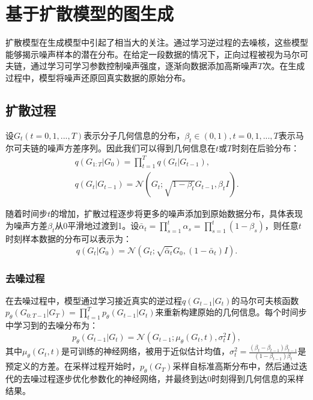 \section{基于扩散模型的图生成}
扩散模型在生成模型中引起了相当大的关注。通过学习逆过程的去噪核，这些模型能够揭示噪声样本的潜在分布。在给定一段数据的情况下，正向过程被视为马尔可夫链，通过学习可学习参数控制噪声强度，逐渐向数据添加高斯噪声$T$次。在生成过程中，模型将噪声还原回真实数据的原始分布。

\subsection{扩散过程}
设$G_t (t=0, 1, ..., T)$表示分子几何信息的分布，$\beta_t \in (0, 1), t=0, 1, ..., T$表示马尔可夫链的噪声方差序列。因此我们可以得到几何信息在$t$或$T$时刻在后验分布：
\begin{eqnarray}
&q(G_{1:T} | G_0) = \prod^T_{t=1} q(G_t | G_{t-1}), & \\
&q(G_t | G_{t-1}) = \mathcal{N}(G_t; \sqrt{1-\beta_t}G_{t-1}, \beta_t I).&
\end{eqnarray}

随着时间步$t$的增加，扩散过程逐步将更多的噪声添加到原始数据分布，具体表现为噪声方差$\beta_t$从0平滑地过渡到1。设$\bar{\alpha}_t = \prod^t_{s=1} \alpha_s = \prod^t_{s=1}(1-\beta_s)$，则任意$t$时刻样本数据的分布可以表示为：
\begin{equation}
    q(G_t|G_0) = \mathcal{N}(G_t; \sqrt{\bar{\alpha}_t} G_0, (1 - \bar{\alpha}_t) I).
\end{equation} 

\subsubsection{去噪过程}
在去噪过程中，模型通过学习接近真实的逆过程$q(G_{t-1} | G_t)$的马尔可夫核函数$p_\theta(G_{0:T-1}| G_{T}) = \prod^T_{t=1} p_\theta(G_{t-1} | G_t)$来重新构建原始的几何信息。每个时间步中学习到的去噪分布为： 
\begin{equation}
  p_\theta(G_{t-1} | G_t) = \mathcal{N}(G_{t-1}; \mu_\theta(G_t, t), \sigma_t^2 I),
\end{equation}
其中$\mu_\theta(G_t, t)$是可训练的神经网络，被用于近似估计均值，$\sigma^2_t = \frac{(\beta_t - \beta_{t-1})\beta_{t-1}}{(1 - \beta_{t-1}) \beta_t}$是预定义的方差。在采样过程开始时，$p_\theta(G_T)$采样自标准高斯分布中，然后通过迭代的去噪过程逐步优化参数化的神经网络，并最终到达0时刻得到几何信息的采样结果。

